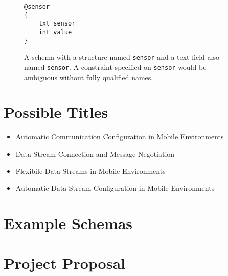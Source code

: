 \documentclass[12pt,twoside,notitlepage]{report}
\begin{document}
\begin{figure}[tbh]
\begin{lstlisting}
@sensor
{
	txt sensor
	int value
}
\end{lstlisting}
\caption[Schema with repeated name]{A schema with a structure named {\tt sensor} and a text field also named {\tt sensor}. A constraint specified on {\tt sensor} would be ambiguous without fully qualified names.}
\label{fig:repeatednameschema}
\end{figure}

\cleardoublepage


\nocite{*}

\cleardoublepage

\appendix

\chapter{Possible Titles}

\begin{itemize}
\item Automatic Communication Configuration in Mobile Environments
\item Data Stream Connection and Message Negotiation
\item Flexibile Data Streams in Mobile Environments
\item Automatic Data Stream Configuration in Mobile Environments
\end{itemize}

\cleardoublepage

\chapter{Example Schemas}



\cleardoublepage

\chapter{Project Proposal}


\end{document}
